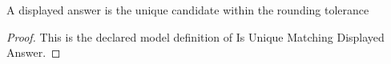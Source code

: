 \begin{definition}
  \label{def:physics:phyx-mini-0174:phyxminiproblems-problemphyxmini0174-isuniquematchingdisplayedanswer}
  A displayed answer is the unique candidate within the rounding tolerance
\end{definition}
\begin{proof}
  This is the declared model definition of Is Unique Matching Displayed Answer.
\end{proof}

